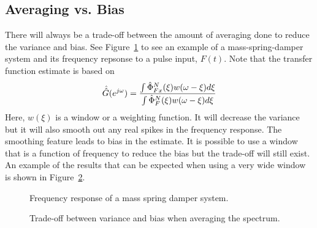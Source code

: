 \subsection{Averaging vs. Bias}
There will always be a trade-off between the amount of averaging done to reduce the variance and bias.
See Figure~\ref{fig:07msd} to see an example of a mass-spring-damper system and its frequency repsonse to a pulse input, $F(t)$.
Note that the transfer function estimate is based on
$$\hat{\hat{G}}(e^{j\omega}) = \frac{\int\hat{\Phi}_{Fx}^N(\xi)w(\omega-\xi)d\xi}{\int \hat{\Phi}_F^N(\xi)w(\omega-\xi)d\xi}$$
Here, $w(\xi)$ is a window or a weighting function.
It will decrease the variance but it will also smooth out any real spikes in the frequency response.
The smoothing feature leads to bias in the estimate.
It is possible to use a window that is a function of frequency to reduce the bias but the trade-off will still exist.
An example of the results that can be expected when using a very wide window is shown in Figure~\ref{fig:07tradeoff}.

\begin{figure}[ht!]
\centering
{} \hfill
{} \hfill
\caption{Frequency response of a mass spring damper system.}
\label{fig:07msd}
\end{figure}

\begin{figure}[ht!]
\centering
{} \hfill
{} \hfill
\caption{Trade-off between variance and bias when averaging the spectrum.}
\label{fig:07tradeoff}
\end{figure}

